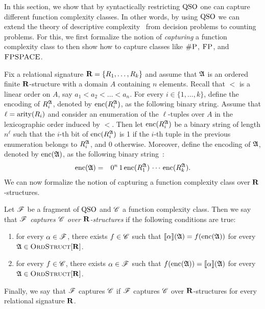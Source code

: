 
In this section, we show that by syntactically restricting ${\rm QSO}$ one can capture different function complexity classes. 
In other words, by using ${\rm QSO}$ we can extend the theory of descriptive complexity~\cite{immerman2012descriptive} from decision problems to counting problems. 
For this, we first formalize the notion of \emph{capturing} a function complexity class to then show how to capture classes like $\text{\sc \#P}$, $\text{\sc FP}$, and $\text{\sc FPSPACE}$.

Fix a relational signature $\mathbf{R} = \{R_1, \ldots, R_k\}$ and assume that $\mathfrak{A}$ is an ordered finite $\mathbf{R}$-structure with a domain $A$ containing $n$ elements. Recall that  $<$ is a linear order on $A$, say $a_1 < a_2 < \ldots < a_n$. For every $i \in \{1, \ldots, k\}$, define the encoding of $R_i^{\mathfrak{A}}$, denoted by ${\rm enc}(R_i^{\mathfrak{A}})$, as the following binary string. Assume that $\ell = {\rm arity}(R_i)$ and consider an enumeration of the $\ell$-tuples over $A$ in the lexicographic order induced by $<$. 
Then let ${\rm enc}(R_i^{\mathfrak{A}})$ be a binary string of length $n^\ell$ such that the $i$-th bit of ${\rm enc}(R_i^{\mathfrak{A}})$ is 1 if the $i$-th tuple in the previous enumeration belongs to $R_i^{\mathfrak{A}}$, and 0 otherwise. Moreover, define the encoding of $\mathfrak{A}$, denoted by ${\rm enc}(\mathfrak{A})$, as the following binary string~\cite{L04}:
\begin{eqnarray*}
	{\rm enc}(\mathfrak{A}) & = & 0^n \, 1 \, {\rm enc}(R_1^{\mathfrak{A}}) \, \cdots \, {\rm enc}(R_k^{\mathfrak{A}}).
\end{eqnarray*}
We can now formalize the notion of capturing a function complexity class over $\mathbf{R}$-structures.
\begin{definition} \label{def:cap}
	Let $\mathscr{F}$ be a fragment of ${\rm QSO}$ and $\mathscr{C}$ a function complexity class. Then we say that {\em  $\mathscr{F}$ captures $\mathscr{C}$ over $\mathbf{R}$-structures} if the  following conditions are true:
	\begin{enumerate}
		\item for every $\alpha \in \mathscr{F}$, there exists $f \in \mathscr{C}$ such that ${\llbracket{}{\alpha}\rrbracket}(\mathfrak{A}) = f({\rm enc}(\mathfrak{A}))$ for every $\mathfrak{A} \in \text{\sc OrdStruct}[\mathbf{R}]$. 
		
		\item for every $f \in \mathscr{C}$, there exists $\alpha \in \mathscr{F}$ such that   $f({\rm enc}(\mathfrak{A})) = {\llbracket{}{\alpha}\rrbracket}(\mathfrak{A})$ for every $\mathfrak{A} \in \text{\sc OrdStruct}[\mathbf{R}]$.
	\end{enumerate} 
	Finally, we say that $\mathscr{F}$ captures $\mathscr{C}$ if $\mathscr{F}$ captures $\mathscr{C}$ over $\mathbf{R}$-structures for every relational signature $\mathbf{R}$.
\end{definition}
